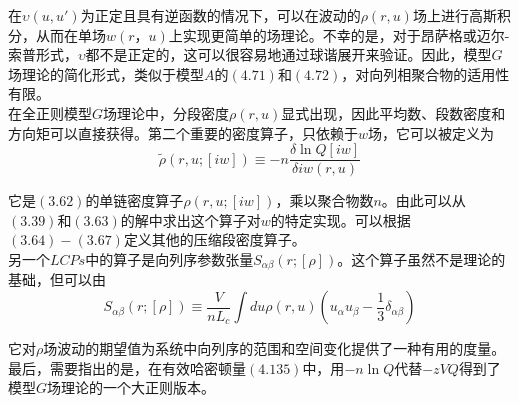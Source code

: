 在$\upsilon(u,u')$为正定且具有逆函数的情况下，可以在波动的$\rho(r,u)$场上进行高斯积分，从而在单场$w(r，u)$上实现更简单的场理论。不幸的是，对于昂萨格或迈尔-索普形式，$\upsilon$都不是正定的，这可以很容易地通过球谐展开来验证。因此，模型$G$场理论的简化形式，类似于模型$A$的$(4.71)$和$(4.72)$，对向列相聚合物的适用性有限。\\

在全正则模型$G$场理论中，分段密度$\rho(r,u)$显式出现，因此平均数、段数密度和方向矩可以直接获得。第二个重要的密度算子，只依赖于$w$场，它可以被定义为\\
\begin{equation}
\tilde{\rho}(r,u;[i w]) \equiv -n \frac{\delta \ln Q[i w]}{\delta i w(r,u)}
\end{equation}

它是$(3.62)$的单链密度算子$\rho(r,u;[i w])$，乘以聚合物数$n$。由此可以从$(3.39)$和$(3.63)$的解中求出这个算子对$w$的特定实现。可以根据$(3.64)-(3.67)$定义其他的压缩段密度算子。\\

另一个$LCPs$中的算子是向列序参数张量$S_{\alpha \beta}(r;[\rho])$。这个算子虽然不是理论的基础，但可以由\\
\begin{equation}
S_{\alpha \beta}(r;[\rho]) \equiv \frac{V}{n L_{c}} \int du \rho(r,u)(u_{\alpha} u_{\beta}-\frac{1}{3} \delta_{\alpha \beta})
\end{equation}

它对$\rho$场波动的期望值为系统中向列序的范围和空间变化提供了一种有用的度量。最后，需要指出的是，在有效哈密顿量$(4.135)$中，用$-n \ln Q$代替$-z VQ$得到了模型$G$场理论的一个大正则版本。\\